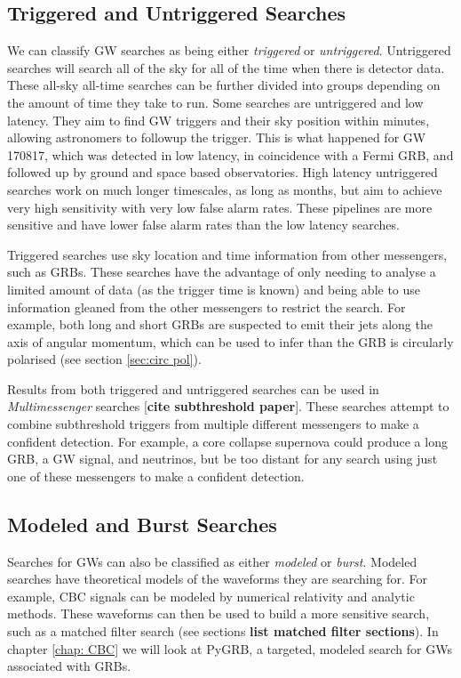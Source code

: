 \documentclass[11pt]{cuthesis}
\begin{document}
\subsection{Triggered and Untriggered Searches}
We can classify GW searches as being either \textit{triggered} or \textit{untriggered}. Untriggered searches will search all of the sky for all of the time when there is detector data. These all-sky all-time searches can be further divided into groups depending on the amount of time they take to run. Some searches are untriggered and low latency\cite{pycbc_live,gstlal_Sachdev:2019,CWB}. They aim to find GW triggers and their sky position within minutes, allowing astronomers to followup the trigger. This is what happened for GW 170817, which was detected in low latency, in coincidence with a Fermi GRB, and followed up by ground and space based observatories. High latency untriggered  searches \cite{pycbc_Usman:2015,gstlal_Sachdev:2019} work on much longer timescales, as long as months, but aim to achieve very high sensitivity with very low false alarm rates. These pipelines are more sensitive and have lower false alarm rates than the low latency searches. 

Triggered searches use sky location and time information from other messengers\cite{pygrb_Williamson:2014,pygrb_harry,xpipeline}, such as GRBs. These searches have the advantage of only needing to analyse a limited amount of data (as the trigger time is known) and being able to use information gleaned from the other messengers to restrict the search. For example, both long and short GRBs are suspected to emit their jets along the axis of angular momentum, which can be used to infer than the GRB is circularly polarised (see section \ref{sec:circ pol}).

Results from both triggered and untriggered searches can be used in \textit{Multimessenger} searches [\textbf{cite subthreshold paper}]. These searches attempt to combine subthreshold triggers from multiple different messengers to make a confident detection. For example, a core collapse supernova could produce a long GRB, a GW signal, and neutrinos, but be too distant for any search using just one of these messengers to make a confident detection. 

\subsection{Modeled and Burst Searches}
Searches for GWs can also be classified as either \textit{modeled} or \textit{burst}. Modeled searches have theoretical models of the waveforms they are searching for. For example, CBC signals can be modeled by numerical relativity and analytic methods\cite{phenom_Khan:2015}. These waveforms can then be used to build a more sensitive search, such as a matched filter search (see sections \textbf{list matched filter sections}). In chapter \ref{chap: CBC} we will look at PyGRB, a targeted, modeled search for GWs associated with GRBs. 
\end{document}
